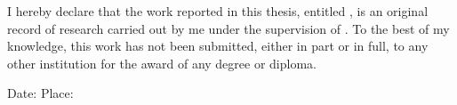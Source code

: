 
I hereby declare that the work reported in this thesis, entitled \textbf{}, is an
original record of research carried out by me under the supervision of \textbf{\ThesisSupervisorName}. To
the best of my knowledge, this work has not been submitted, either in part or in full, to any other
institution for the award of any degree or diploma.

\vspace{2.5cm}
\begin{flushright}
\SignatureBlock[0.34\textwidth]{%
\textbf{\ThesisAuthorName}\\
\ThesisRollNumber\\
\ThesisDepartment
}
\end{flushright}

\vfill
\noindent Date: \ThesisApprovalDate \hfill Place: \ThesisPlace
\clearpage

